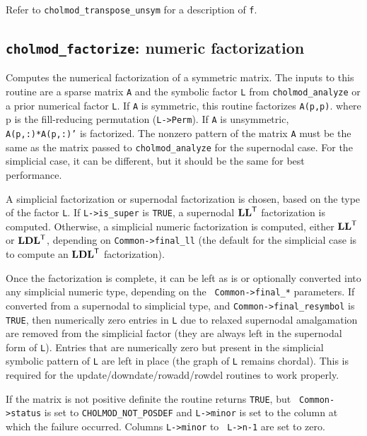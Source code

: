 \documentclass[11pt]{article}
\newcommand{\m}[1]{{\bf{#1}}}       %
\newcommand{\tr}{^{\sf T}}          %
\begin{document}
Refer to {\tt cholmod\_transpose\_unsym} for a description of {\tt f}.

\subsection{{\tt cholmod\_factorize}: numeric factorization}

 Computes the numerical factorization of a symmetric
matrix.  The inputs to this routine are a sparse matrix {\tt A} and the
symbolic factor {\tt L} from {\tt cholmod\_analyze} or a prior numerical factor
{\tt L}.  If {\tt A} is symmetric, this routine factorizes {\tt A(p,p)}.  where
p is the fill-reducing permutation ({\tt L->Perm}).  If {\tt A} is unsymmetric,
{\tt A(p,:)*A(p,:)'} is factorized.  The nonzero pattern of the matrix {\tt A}
must be the same as the matrix passed to {\tt cholmod\_analyze} for the
supernodal case.  For the simplicial case, it can be different, but it should
be the same for best performance.

A simplicial factorization or supernodal factorization is chosen, based on the
type of the factor {\tt L}.  If {\tt L->is\_super} is {\tt TRUE}, a supernodal
$\m{LL}\tr$ factorization is computed.  Otherwise, a simplicial numeric
factorization is computed, either $\m{LL}\tr$ or $\m{LDL}\tr$, depending on
{\tt Common->final\_ll} (the default for the simplicial case is to compute an
$\m{LDL}\tr$ factorization).

Once the factorization is complete, it can be left as is or optionally
converted into any simplicial numeric type, depending on the {\tt
Common->final\_*} parameters.  If converted from a supernodal to simplicial
type, and {\tt Common->final\_resymbol} is {\tt TRUE}, then numerically zero
entries in {\tt L} due to relaxed supernodal amalgamation are removed from the
simplicial factor (they are always left in the supernodal form of {\tt L}).
Entries that are numerically zero but present in the simplicial symbolic
pattern of {\tt L} are left in place (the graph of {\tt L} remains chordal).
This is required for the update/downdate/rowadd/rowdel routines to work
properly.

If the matrix is not positive definite the routine returns {\tt TRUE}, but {\tt
Common->status} is set to {\tt CHOLMOD\_NOT\_POSDEF} and {\tt L->minor} is set
to the column at which the failure occurred.  Columns {\tt L->minor} to {\tt
L->n-1} are set to zero.
\end{document}
